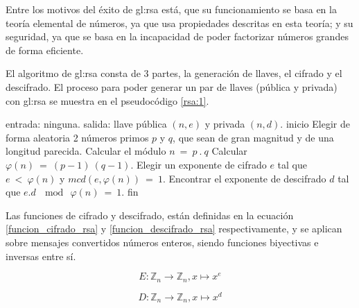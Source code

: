   Entre los motivos del éxito de \acrshort{gl:rsa} está, que su funcionamiento 
  se basa en la teoría elemental de números, ya que usa propiedades descritas 
  en esta teoría; y su seguridad, ya que se basa en la incapacidad de poder 
  factorizar números grandes de forma eficiente.

  El algoritmo de \acrshort{gl:rsa} consta de 3 partes, la generación de llaves, 
  el cifrado y el descifrado. El proceso para poder generar un par de llaves 
  (pública y privada) con \acrshort{gl:rsa} se muestra en el pseudocódigo 
  \ref{rsa:1}. 

  \begin{pseudocodigo}[caption={Proceso de generación de llaves de 
    \acrshort{gl:rsa}.}, label={rsa:1}]
    entrada: ninguna.
    salida:  llave pública $(n,e)$ y privada $(n,d)$.
    inicio
      Elegir de forma aleatoria 2 números primos $p$ y $q$, que sean de gran 
      magnitud y de una longitud parecida.
      Calcular el módulo $n\: =\: p \:. \:q$
      Calcular $\varphi(n) \:= \:(p-1) \:(q-1)$.
      Elegir un exponente de cifrado $e$ tal que $e \:< \:\varphi(n)$ y $mcd(e,\varphi(n)) \:= \:1$.
      Encontrar el exponente de descifrado $d$ tal que $e . d \:\mod \:\varphi(n) \:= \:1$.
    fin
  \end{pseudocodigo}

  Las funciones de cifrado y descifrado, están definidas en la ecuación 
  \ref{funcion_cifrado_rsa} y \ref{funcion_descifrado_rsa} respectivamente, 
  y se aplican sobre mensajes convertidos números enteros, siendo funciones 
  biyectivas e inversas entre sí.

  \begin{equation}
    \label{funcion_cifrado_rsa}
    E: \mathbb{Z}_n \longrightarrow \mathbb{Z}_n, x \longmapsto x^e 
  \end{equation}

  \begin{equation}
    \label{funcion_descifrado_rsa}
    D: \mathbb{Z}_n \longrightarrow \mathbb{Z}_n, x \longmapsto x^d 
  \end{equation}

